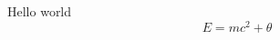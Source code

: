 \documentclass[a4j]{jarticle}
\begin{document}
Hello world
\begin{equation} 
    E = mc^{2} + \theta
\end{equation}
\end{document}
